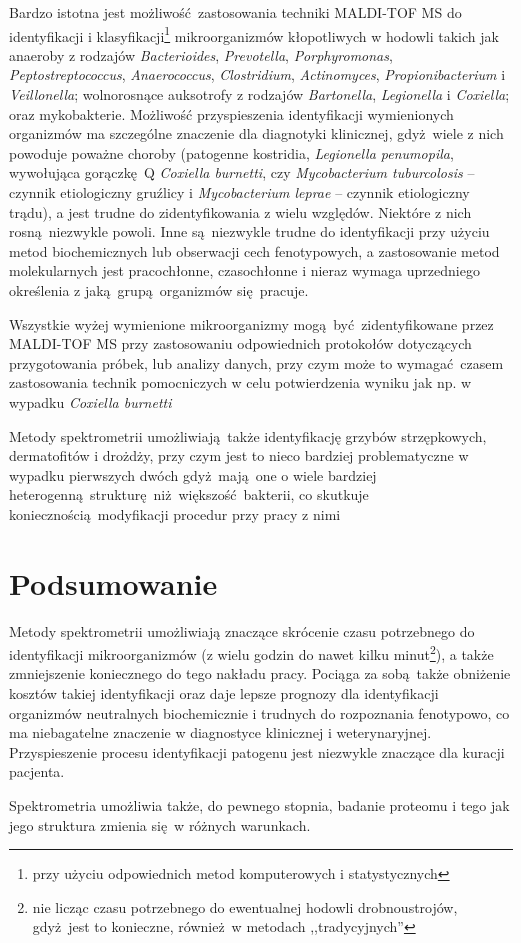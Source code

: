 \documentclass[two column, twoside, a4paper]{article}
\newcommand{\maldi}{MALDI-TOF MS }
\begin{document}
Bardzo istotna jest możliwość zastosowania techniki \maldi do identyfikacji i klasyfikacji\footnote{przy użyciu odpowiednich metod komputerowych i statystycznych} mikroorganizmów kłopotliwych w hodowli takich jak anaeroby z rodzajów \textit{Bacterioides}, \textit{Prevotella}, \textit{Porphyromonas}, \textit{Peptostreptococcus}, \textit{Anaerococcus}, \textit{Clostridium}, \textit{Actinomyces}, \textit{Propionibacterium} i \textit{Veillonella}; wolnorosnące auksotrofy z rodzajów \textit{Bartonella}, \textit{Legionella} i  \textit{Coxiella}; oraz mykobakterie. Możliwość przyspieszenia identyfikacji wymienionych organizmów ma szczególne znaczenie dla diagnotyki klinicznej, gdyż wiele z nich powoduje poważne choroby (patogenne kostridia, \textit{Legionella penumopila}, wywołująca gorączkę Q \textit{Coxiella burnetti}, czy \textit{Mycobacterium tuburcolosis} -- czynnik etiologiczny gruźlicy i \textit{Mycobacterium leprae} -- czynnik etiologiczny trądu), a jest trudne do zidentyfikowania z wielu względów. Niektóre z nich rosną niezwykle powoli. Inne są niezwykle trudne do identyfikacji przy użyciu metod biochemicznych lub obserwacji cech fenotypowych, a zastosowanie metod molekularnych jest pracochłonne, czasochłonne i nieraz wymaga uprzedniego określenia z jaką grupą organizmów się pracuje\autocite{Biswas2013}.

Wszystkie wyżej wymienione mikroorganizmy mogą być zidentyfikowane przez \maldi przy zastosowaniu odpowiednich protokołów dotyczących przygotowania próbek, lub analizy danych, przy czym może to wymagać czasem zastosowania technik pomocniczych w celu potwierdzenia wyniku jak np. w wypadku \textit{Coxiella burnetti}\autocite{Biswas2013, Croxatto2012}

Metody spektrometrii umożliwiają także identyfikację grzybów strzępkowych, dermatofitów i drożdży, przy czym jest to nieco bardziej problematyczne w wypadku pierwszych dwóch gdyż mają one o wiele bardziej heterogenną strukturę niż większość bakterii, co skutkuje koniecznością modyfikacji procedur przy pracy z nimi\autocite{Croxatto2012}

\section{Podsumowanie}

Metody spektrometrii umożliwiają znaczące skrócenie czasu potrzebnego do identyfikacji mikroorganizmów (z wielu godzin do nawet kilku minut\footnote{nie licząc czasu potrzebnego do ewentualnej hodowli drobnoustrojów, gdyż jest to konieczne, również w metodach ,,tradycyjnych''}), a także zmniejszenie koniecznego do tego nakładu pracy. Pociąga za sobą także obniżenie kosztów takiej identyfikacji oraz daje lepsze prognozy dla identyfikacji organizmów neutralnych biochemicznie i trudnych do rozpoznania fenotypowo, co ma niebagatelne znaczenie w diagnostyce klinicznej i weterynaryjnej. Przyspieszenie procesu identyfikacji patogenu jest niezwykle znaczące dla kuracji pacjenta.

Spektrometria umożliwia także, do pewnego stopnia, badanie proteomu i tego jak jego struktura zmienia się w różnych warunkach.

\printbibliography
\end{document}
